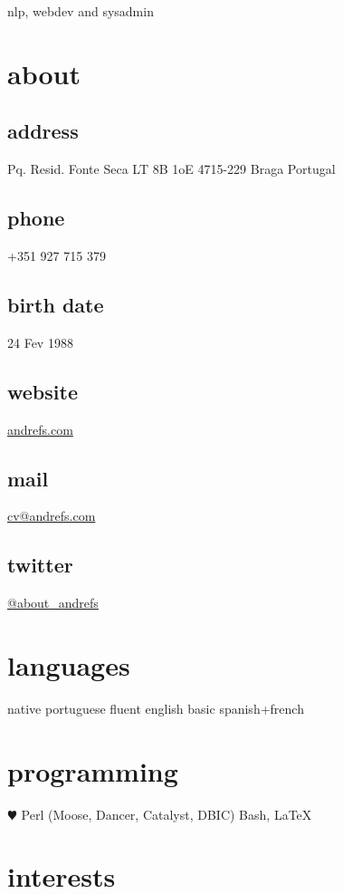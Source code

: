 \documentclass[a4paper]{friggeri-cv}
\begin{document}
       {nlp, webdev and sysadmin}



\begin{aside}
  \section{about}
\begin{sensitive}
  	\subsection{address}
  	Pq. Resid. Fonte Seca
	LT 8B 1oE
	4715-229 Braga
	Portugal
  	\subsection{phone}
	+351 927 715 379
  	\subsection{birth date}
    24 Fev 1988
\end{sensitive}
  	\subsection{website}
	\url{andrefs.com}
  	\subsection{mail}
	\href{mailto:cv@andrefs.com}{cv@andrefs.com}
  	\subsection{twitter}
	\href{http://witter.com/about_andrefs}{@about\_andrefs}
  \section{languages}
  	native portuguese
	fluent english
    basic spanish+french
  \section{programming}
    {$\varheartsuit$} Perl (Moose, Dancer, Catalyst, DBIC)
	Bash, \LaTeX
\end{aside}

\section{interests}
\end{document}
